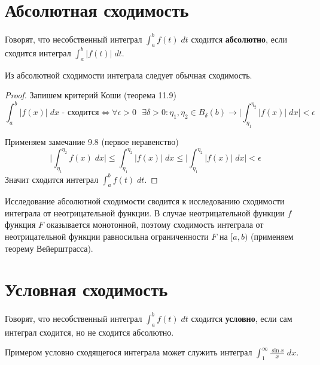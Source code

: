 	\section{Абсолютная сходимость}
	
	\begin{definition}
		Говорят, что несобственный интеграл $\displaystyle \int_a^b f(t) \; dt$ сходится \textbf{абсолютно}, если сходится интеграл $\displaystyle \int_a^b |f(t)| \; dt$.
	\end{definition}
	
	\begin{sentence}
		Из абсолютной сходимости интеграла следует обычная сходимость.
	\end{sentence}
	
	\begin{proof}
		Запишем критерий Коши (теорема 11.9)
		\[ \int_a^b |f(x)| \; dx \text{ - сходится} \Leftrightarrow \forall \epsilon > 0 \text{ } \exists \delta > 0: \eta_1, \eta_2 \in B_{\delta}(b) \rightarrow \bigg| \int_{\eta_1}^{\eta_2} |f(x)| \; dx \bigg| < \epsilon \]
		
		Применяем замечание 9.8 (первое неравенство)
		\[ \bigg| \int_{\eta_1}^{\eta_2} f(x) \; dx \bigg| \leqslant \int_{\eta_1}^{\eta_2} |f(x)| \; dx \leqslant \bigg| \int_{\eta_1}^{\eta_2} |f(x)| \; dx \bigg| < \epsilon \]
		Значит сходится интеграл $\displaystyle \int_a^b f(t) \; dt$.
	\end{proof}
	
	\begin{mention}
		Исследование абсолютной сходимости сводится к исследованию сходимости интеграла от неотрицательной функции. В случае неотрицательной функции $f$ функция $F$ оказывается монотонной, поэтому сходимость интеграла от неотрицательной функции равносильна ограниченности $F$ на $[a, b)$ (применяем теорему Вейерштрасса).	
	\end{mention}
	
	\section{Условная сходимость}
	
	\begin{definition}
		Говорят, что несобственный интеграл $\int_a^b f(t) \; dt$ сходится \textbf{условно}, если сам интеграл сходится, но не сходится
		абсолютно.
	\end{definition}
	
	\begin{example}
		Примером условно сходящегося интеграла может служить интеграл $\displaystyle \int_1^{\infty} \frac{\sin{x}}{x} \; dx$.
    \end{example}
    
